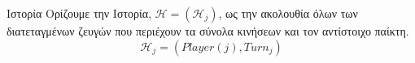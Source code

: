{}
\begin{definitiongr}{Ιστορία}
  Ορίζουμε την Ιστορία, $\mathcal{H} = \left(\mathcal{H}_j\right)$, ως την ακολουθία όλων των διατεταγμένων ζευγών που
  περιέχουν τα σύνολα κινήσεων και τον αντίστοιχο παίκτη.
  \begin{equation}
    \mathcal{H}_j = \left(Player\left(j\right), Turn_j\right)
  \end{equation}
\end{definitiongr}
